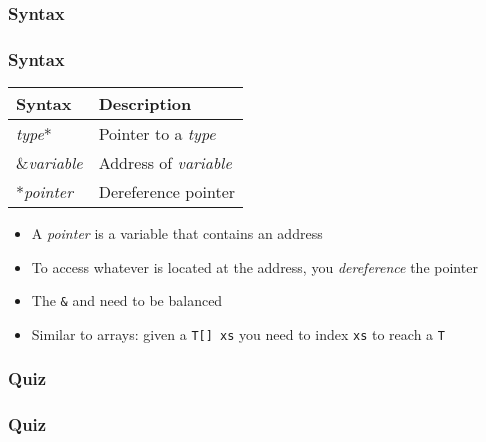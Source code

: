 \documentclass{../ucll-slides}
\begin{document}
\begin{frame}
  \frametitle{Syntax}
  \vskip5mm

\end{frame}

\begin{frame}
  \frametitle{Syntax}
  \begin{center}
    \begin{tabular}{ll}
      \textbf{Syntax}  & \textbf{Description} \\
      \toprule
      {\it type}*      & Pointer to a {\it type} \\
      \&{\it variable} & Address of {\it variable} \\
      *{\it pointer}   & Dereference pointer \\
    \end{tabular}
  \end{center}
  \begin{itemize}
    \item A \emph{pointer} is a variable that contains an address
    \item To access whatever is located at the address, you \emph{dereference} the pointer
    \item The {\tt \&} and {\tt *} need to be balanced
    \item Similar to arrays: given a {\tt T[] xs} you need to index {\tt xs} to reach a {\tt T}
  \end{itemize}
\end{frame}

\begin{frame}
  \frametitle{Quiz}
  \begin{center}
  \end{center}
\end{frame}

\begin{frame}
  \frametitle{Quiz}
  \begin{center}
  \end{center}
\end{frame}
\end{document}
